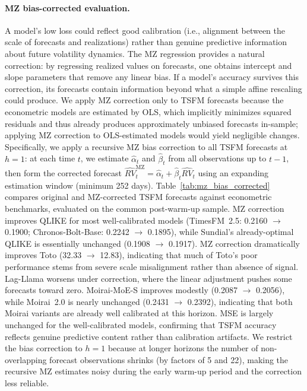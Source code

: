\documentclass[12pt]{article}
\begin{document}
\paragraph{MZ bias-corrected evaluation.}
A model's low loss could reflect good calibration (i.e., alignment between the scale of forecasts and realizations) rather than genuine predictive information about future volatility dynamics. The MZ regression provides a natural correction: by regressing realized values on forecasts, one obtains intercept and slope parameters that remove any linear bias. If a model's accuracy survives this correction, its forecasts contain information beyond what a simple affine rescaling could produce. We apply MZ correction only to TSFM forecasts because the econometric models are estimated by OLS, which implicitly minimizes squared residuals and thus already produces approximately unbiased forecasts in-sample; applying MZ correction to OLS-estimated models would yield negligible changes. Specifically, we apply a recursive MZ bias correction to all TSFM forecasts at $h = 1$: at each time $t$, we estimate $\hat{\alpha}_t$ and $\hat{\beta}_t$ from all observations up to $t - 1$, then form the corrected forecast $\widehat{RV}_t^{\text{MZ}} = \hat{\alpha}_t + \hat{\beta}_t \widehat{RV}_t$ using an expanding estimation window (minimum 252 days). Table~\ref{tab:mz_bias_corrected} compares original and MZ-corrected TSFM forecasts against econometric benchmarks, evaluated on the common post-warm-up sample. MZ correction improves QLIKE for most well-calibrated models (TimesFM~2.5: 0.2160 $\to$ 0.1900; Chronos-Bolt-Base: 0.2242 $\to$ 0.1895), while Sundial's already-optimal QLIKE is essentially unchanged (0.1908 $\to$ 0.1917). MZ correction dramatically improves Toto (32.33 $\to$ 12.83), indicating that much of Toto's poor performance stems from severe scale misalignment rather than absence of signal. Lag-Llama worsens under correction, where the linear adjustment pushes some forecasts toward zero. Moirai-MoE-S improves modestly (0.2087 $\to$ 0.2056), while Moirai~2.0 is nearly unchanged (0.2431 $\to$ 0.2392), indicating that both Moirai variants are already well calibrated at this horizon. MSE is largely unchanged for the well-calibrated models, confirming that TSFM accuracy reflects genuine predictive content rather than calibration artifacts. We restrict the bias correction to $h = 1$ because at longer horizons the number of non-overlapping forecast observations shrinks (by factors of 5 and 22), making the recursive MZ estimates noisy during the early warm-up period and the correction less reliable.
\end{document}
